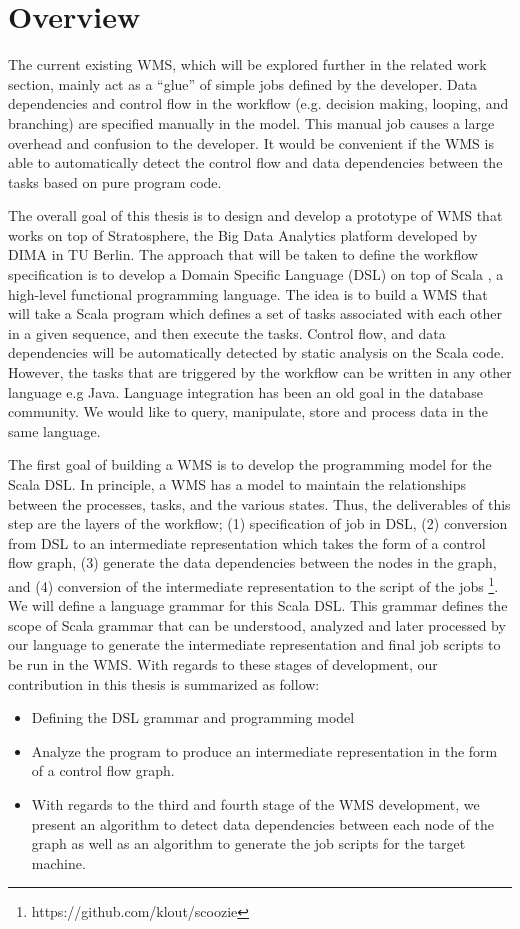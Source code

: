 \section{Overview}
The current existing WMS, which will be explored further in the related work section, mainly act as a “glue” of simple jobs defined by the developer. Data dependencies and control flow in the workflow (e.g. decision making, looping, and branching) are specified manually in the model. This manual job causes a large overhead and confusion to the developer. It would be convenient if the WMS is able to automatically detect the control flow and data dependencies between the tasks based on pure program code. 

The overall goal of this thesis is to design and develop a prototype of WMS that works on top of Stratosphere, the Big Data Analytics platform developed by DIMA in TU Berlin. The approach that will be taken to define the workflow specification is to develop a Domain Specific Language (DSL) on top of Scala \cite{odersky2004overview}, a high-level functional programming language. The idea is to build a WMS that will take a Scala program which defines a set of tasks associated with each other in a given sequence, and then execute the tasks. Control flow, and data dependencies will be automatically detected by static analysis on the Scala code. However, the tasks that are triggered by the workflow can be written in any other language e.g Java. Language integration has been an old goal in the database community. We would like to query, manipulate, store and process data in the same language. 

The first goal of building a WMS is to develop the programming model for the Scala DSL. In principle, a WMS has a model to maintain the relationships between the processes, tasks, and the various states. Thus, the deliverables of this step are the layers of the workflow; (1) specification of job in DSL, (2) conversion from DSL to an intermediate representation which takes the form of a control flow graph, (3) generate the data dependencies between the nodes in the graph, and (4) conversion of the intermediate representation to the script of the jobs \footnote{\label{scoozie}https://github.com/klout/scoozie}. We will define a language grammar for this Scala DSL. This grammar defines the scope of Scala grammar \cite{odersky2004scala} that can be understood, analyzed and later processed by our language  to generate the intermediate representation and final job scripts to be run in the WMS. With regards to these stages of development, our contribution in this thesis is summarized as follow:
\begin{itemize}
\item Defining the DSL grammar and programming model
\item Analyze the program to produce an intermediate representation in the form of a control flow graph. 
\item With regards to the third and fourth stage of the WMS development, we present an algorithm to detect data dependencies between each node of the graph as well as an algorithm to generate the job scripts for the target machine. 
\end{itemize}


